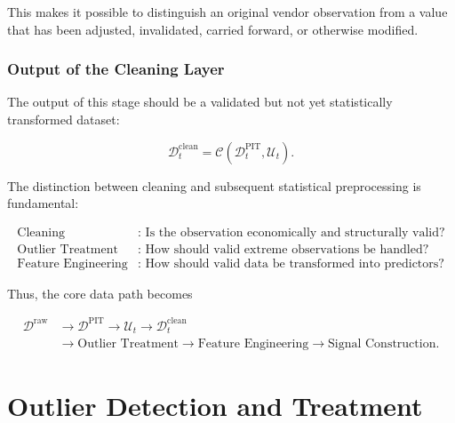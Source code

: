 \documentclass[11pt,a4paper]{article}
\begin{document}
This makes it possible to distinguish an original vendor observation from a
value that has been adjusted, invalidated, carried forward, or otherwise
modified.


\subsubsection{Output of the Cleaning Layer}

The output of this stage should be a validated but not yet statistically
transformed dataset:

\begin{equation}
\boxed{
\mathcal{D}_t^{\mathrm{clean}}
=
\mathcal{C}
\left(
\mathcal{D}_t^{\mathrm{PIT}},
\mathcal{U}_t
\right).
}
\end{equation}

The distinction between cleaning and subsequent statistical preprocessing is
fundamental:

\begin{equation}
\boxed{
\begin{aligned}
\text{Cleaning}
&:
\text{ Is the observation economically and structurally valid?}
\\[0.15cm]
\text{Outlier Treatment}
&:
\text{ How should valid extreme observations be handled?}
\\[0.15cm]
\text{Feature Engineering}
&:
\text{ How should valid data be transformed into predictors?}
\end{aligned}
}
\end{equation}

Thus, the core data path becomes

\begin{equation}
\boxed{
\begin{aligned}
\mathcal{D}^{\mathrm{raw}}
&\rightarrow
\mathcal{D}^{\mathrm{PIT}}
\rightarrow
\mathcal{U}_t
\rightarrow
\mathcal{D}_t^{\mathrm{clean}}
\\[0.1cm]
&\rightarrow
\text{Outlier Treatment}
\rightarrow
\text{Feature Engineering}
\rightarrow
\text{Signal Construction}.
\end{aligned}
}
\end{equation}


\section{Outlier Detection and Treatment}
\label{sec:outlier_detection}
\end{document}
